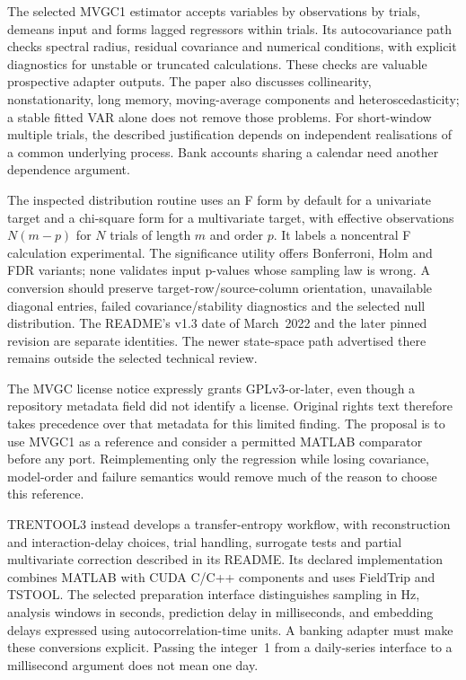 The selected MVGC1 estimator accepts variables by observations by trials,
demeans input and forms lagged regressors within trials. Its autocovariance
path checks spectral radius, residual covariance and numerical conditions,
with explicit diagnostics for unstable or truncated calculations. These
checks are valuable prospective adapter outputs. The paper also discusses
collinearity, nonstationarity, long memory, moving-average components and
heteroscedasticity; a stable fitted VAR alone does not remove those problems.
For short-window multiple trials, the described justification depends on
independent realisations of a common underlying process. Bank accounts sharing
a calendar need another dependence argument.
\citep{exec17_temporal_mvgc,exec17_temporal_mvgc_paper}

The inspected distribution routine uses an F form by default for a
univariate target and a chi-square form for a multivariate target, with
effective observations $N(m-p)$ for $N$ trials of length $m$ and order $p$.
It labels a noncentral F calculation experimental. The significance utility
offers Bonferroni, Holm and FDR variants; none validates input p-values whose
sampling law is wrong. A conversion should preserve target-row/source-column
orientation, unavailable diagonal entries, failed covariance/stability
diagnostics and the selected null distribution.
The README's v1.3 date of March~2022 and the later pinned revision are separate
identities. The newer state-space path advertised there remains outside the
selected technical review.
\citep{exec17_temporal_mvgc}

The MVGC license notice expressly grants GPLv3-or-later, even though a
repository metadata field did not identify a license. Original rights text
therefore takes precedence over that metadata for this limited finding.
The proposal is to use MVGC1 as a reference and consider a permitted MATLAB
comparator before any port. Reimplementing only the regression while losing
covariance, model-order and failure semantics would remove much of the
reason to choose this reference.
\citep{exec17_temporal_mvgc}

TRENTOOL3 instead develops a transfer-entropy workflow, with reconstruction
and interaction-delay choices, trial handling, surrogate tests and
partial multivariate correction described in its README. Its declared
implementation combines MATLAB with CUDA C/C++ components and uses FieldTrip
and TSTOOL. The selected preparation interface distinguishes sampling in Hz,
analysis windows in seconds, prediction delay in milliseconds, and embedding
delays expressed using autocorrelation-time units. A banking adapter must make
these conversions explicit. Passing the integer~1 from a daily-series
interface to a millisecond argument does not mean one day.
\citep{exec17_temporal_trentool}

